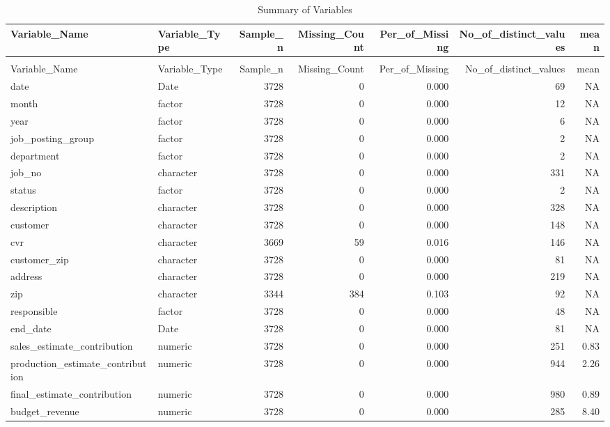 \begingroup\fontsize{9}{11}\selectfont

\begin{landscape}
\begin{longtable}[t]{llrrrrr}
\caption{Summary of Variables}\\
\toprule
Variable\_Name & Variable\_Type & Sample\_n & Missing\_Count & Per\_of\_Missing & No\_of\_distinct\_values & mean\\
\midrule
\endfirsthead
\caption[]{Summary of Variables }\\
\toprule
Variable\_Name & Variable\_Type & Sample\_n & Missing\_Count & Per\_of\_Missing & No\_of\_distinct\_values & mean\\
\midrule
\endhead

\endfoot
\bottomrule
\endlastfoot
date & Date & 3728 & 0 & 0.000 & 69 & NA\\
month & factor & 3728 & 0 & 0.000 & 12 & NA\\
year & factor & 3728 & 0 & 0.000 & 6 & NA\\
job\_posting\_group & factor & 3728 & 0 & 0.000 & 2 & NA\\
department & factor & 3728 & 0 & 0.000 & 2 & NA\\
job\_no & character & 3728 & 0 & 0.000 & 331 & NA\\
status & factor & 3728 & 0 & 0.000 & 2 & NA\\
description & character & 3728 & 0 & 0.000 & 328 & NA\\
customer & character & 3728 & 0 & 0.000 & 148 & NA\\
cvr & character & 3669 & 59 & 0.016 & 146 & NA\\
customer\_zip & character & 3728 & 0 & 0.000 & 81 & NA\\
address & character & 3728 & 0 & 0.000 & 219 & NA\\
zip & character & 3344 & 384 & 0.103 & 92 & NA\\
responsible & factor & 3728 & 0 & 0.000 & 48 & NA\\
end\_date & Date & 3728 & 0 & 0.000 & 81 & NA\\
sales\_estimate\_contribution & numeric & 3728 & 0 & 0.000 & 251 & 0.83\\
production\_estimate\_contribution & numeric & 3728 & 0 & 0.000 & 944 & 2.26\\
final\_estimate\_contribution & numeric & 3728 & 0 & 0.000 & 980 & 0.89\\
budget\_revenue & numeric & 3728 & 0 & 0.000 & 285 & 8.40\\

\end{longtable}
\end{landscape}
